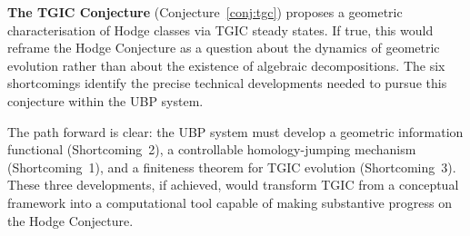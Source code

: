 \documentclass[11pt,a4paper]{article}
\theoremstyle{definition}
\theoremstyle{plain}
\begin{document}
\textbf{The TGIC Conjecture} (Conjecture~\ref{conj:tgc}) proposes a geometric characterisation of Hodge classes via TGIC steady states. If true, this would reframe the Hodge Conjecture as a question about the dynamics of geometric evolution rather than about the existence of algebraic decompositions. The six shortcomings identify the precise technical developments needed to pursue this conjecture within the UBP system.

The path forward is clear: the UBP system must develop a geometric information functional (Shortcoming~2), a controllable homology-jumping mechanism (Shortcoming~1), and a finiteness theorem for TGIC evolution (Shortcoming~3). These three developments, if achieved, would transform TGIC from a conceptual framework into a computational tool capable of making substantive progress on the Hodge Conjecture.
\end{document}
